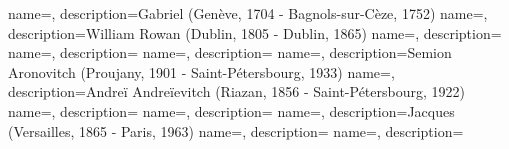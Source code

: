  {
    name=,
    description={Gabriel (Genève, 1704 - Bagnols-sur-Cèze, 1752)}
}
 {
    name=,
    description={William Rowan (Dublin, 1805 - Dublin, 1865)}
}
 {
    name=,
    description={}
}
 {
    name=,
    description={}
}
 {
    name=,
    description={}
}
 {
    name=,
    description={Semion Aronovitch (Proujany, 1901 - Saint-Pétersbourg, 1933)}
}
 {
    name=,
    description={Andreï Andreïevitch (Riazan, 1856 - Saint-Pétersbourg, 1922)}
}
 {
    name=,
    description={}
}
 {
    name=,
    description={}
}
 {
    name=,
    description={Jacques (Versailles, 1865 - Paris, 1963)}
}
 {
    name=,
    description={}
}
 {
    name=,
    description={}
}

